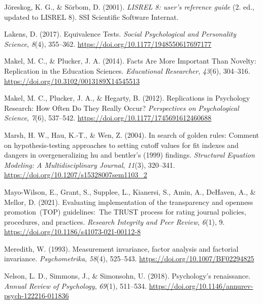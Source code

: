 \documentclass[
  man]{apa7}
\newlength{\cslhangindent}
\newlength{\cslentryspacingunit} %
\newenvironment{CSLReferences}[2] %
 {%
  \setlength{\parindent}{0pt}
  \ifodd #1
  \let\oldpar\par
  \def\par{\hangindent=\cslhangindent\oldpar}
  \fi
  \setlength{\parskip}{#2\cslentryspacingunit}
 }%
 {}
\begin{document}
\begin{CSLReferences}{1}{0}
\leavevmode{}%
Jöreskog, K. G., \& Sörbom, D. (2001). \emph{LISREL 8: user's reference guide} (2. ed., updated to LISREL 8). SSI Scientific Software Internat.

\leavevmode{}%
Lakens, D. (2017). Equivalence Tests. \emph{Social Psychological and Personality Science}, \emph{8}(4), 355--362. \url{https://doi.org/10.1177/1948550617697177}

\leavevmode{}%
Makel, M. C., \& Plucker, J. A. (2014). Facts Are More Important Than Novelty: Replication in the Education Sciences. \emph{Educational Researcher}, \emph{43}(6), 304--316. \url{https://doi.org/10.3102/0013189X14545513}

\leavevmode{}%
Makel, M. C., Plucker, J. A., \& Hegarty, B. (2012). Replications in Psychology Research: How Often Do They Really Occur? \emph{Perspectives on Psychological Science}, \emph{7}(6), 537--542. \url{https://doi.org/10.1177/1745691612460688}

\leavevmode{}%
Marsh, H. W., Hau, K.-T., \& Wen, Z. (2004). In search of golden rules: Comment on hypothesis-testing approaches to setting cutoff values for fit indexes and dangers in overgeneralizing hu and bentler's (1999) findings. \emph{Structural Equation Modeling: A Multidisciplinary Journal}, \emph{11}(3), 320--341. \url{https://doi.org/10.1207/s15328007sem1103_2}

\leavevmode{}%
Mayo-Wilson, E., Grant, S., Supplee, L., Kianersi, S., Amin, A., DeHaven, A., \& Mellor, D. (2021). Evaluating implementation of the transparency and openness promotion~(TOP) guidelines:~The TRUST process for rating journal policies, procedures, and practices. \emph{Research Integrity and Peer Review}, \emph{6}(1), 9. \url{https://doi.org/10.1186/s41073-021-00112-8}

\leavevmode{}%
Meredith, W. (1993). Measurement invariance, factor analysis and factorial invariance. \emph{Psychometrika}, \emph{58}(4), 525--543. \url{https://doi.org/10.1007/BF02294825}

\leavevmode{}%
Nelson, L. D., Simmons, J., \& Simonsohn, U. (2018). Psychology's renaissance. \emph{Annual Review of Psychology}, \emph{69}(1), 511--534. \url{https://doi.org/10.1146/annurev-psych-122216-011836}


\end{CSLReferences}
\end{document}
